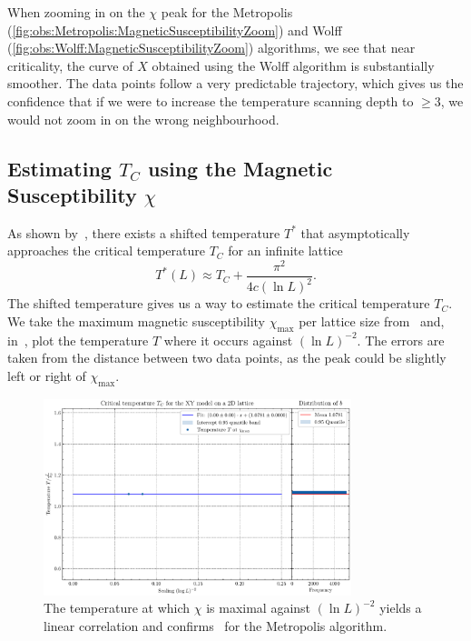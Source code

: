 		When zooming in on the $\chi$ peak for the Metropolis (\cref{fig:obs:Metropolis:MagneticSusceptibilityZoom}) and Wolff (\cref{fig:obs:Wolff:MagneticSusceptibilityZoom}) algorithms, we see that near criticality, the curve of $X$ obtained using the Wolff algorithm is substantially smoother. The data points follow a very predictable trajectory,  which gives us the confidence that if we were to increase the temperature scanning depth to $\geq 3$, we would not zoom in on the wrong neighbourhood.
	
	\subsection{Estimating \texorpdfstring{$T_C$}{T} using the Magnetic Susceptibility \texorpdfstring{$\chi$}{X}}\label{sec:res:temperature}
		As shown by~\citet[eq. 3]{shifted}, there exists a shifted temperature $T^*$ that asymptotically approaches the critical temperature $T_C$ for an infinite lattice
		\begin{equation}\label{eq:shifted_temperature}
			T^*(L) \approx T_C + \frac{\pi^2}{4c (\ln{L})^2}.
		\end{equation}
		The shifted temperature gives us a way to estimate the critical temperature $T_C$. We take the maximum magnetic susceptibility $\chi_\text{max}$ per lattice size from~ and, in~, plot the temperature $T$ where it occurs against $(\ln{L})^{-2}$. The errors are taken from the distance between two data points, as the peak could be slightly left or right of $\chi_\text{max}$.
		\begin{figure}[htbp]
			\centering
			\includegraphics[width=0.8\textwidth]{../figures/Metropolis/Critical_Temperature.pdf}
			\caption[Estimating $T_C$ using the Metropolis algorithm by plotting $T$ where $\chi$ is maximal against $(\ln L)^{-2}$]{The temperature at which $\chi$ is maximal against $(\ln L)^{-2}$ yields a linear correlation and confirms~ for the Metropolis algorithm.}
			\label{fig:critical_temperature}
		\end{figure}
		
